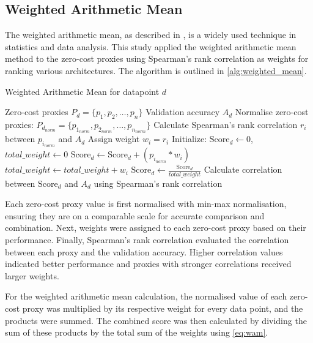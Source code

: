 
\subsection{Weighted Arithmetic Mean}
The weighted arithmetic mean, as described in \autocite{wam}, is a widely used technique in statistics and data analysis. This study applied the weighted arithmetic mean method to the zero-cost proxies using Spearman's rank correlation as weights for ranking various architectures. The algorithm is outlined in \cref{alg:weighted_mean}. 

\clearpage

\begin{algorithm}
\caption{Weighted Arithmetic Mean for datapoint $d$}\label{alg:weighted_mean}
\begin{algorithmic}[1]
\Require Zero-cost proxies $P_d = \{p_1, p_2, \dots, p_n\}$
\Require Validation accuracy $A_d$
\State Normalise zero-cost proxies: $P_{d_{norm}} = \{p_{1_{norm}}, p_{2_{norm}}, \dots, p_{n_{norm}}\}$
    \State Calculate Spearman's rank correlation $r_i$ between $p_{i_{norm}}$ and $A_d$
    \State Assign weight $w_i = r_i$
\EndFor
\State Initialize: $\text{Score}_d \leftarrow 0$, $total\_weight \leftarrow 0$
    \State $\text{Score}_d \leftarrow \text{Score}_d + (p_{i_{norm}} * w_i)$
    \State $total\_weight \leftarrow total\_weight + w_i$
\EndFor
\State $\text{Score}_d \leftarrow \frac{\text{Score}_d}{total\_weight}$
\State Calculate correlation between $\text{Score}_d$ and $A_d$ using Spearman's rank correlation
\end{algorithmic}
\end{algorithm}


Each zero-cost proxy value is first normalised with min-max normalisation, ensuring they are on a comparable scale for accurate comparison and combination. Next, weights were assigned to each zero-cost proxy based on their performance. Finally, Spearman's rank correlation evaluated the correlation between each proxy and the validation accuracy. Higher correlation values indicated better performance and proxies with stronger correlations received larger weights.

For the weighted arithmetic mean calculation, the normalised value of each zero-cost proxy was multiplied by its respective weight for every data point, and the products were summed. The combined score was then calculated by dividing the sum of these products by the total sum of the weights using \cref{eq:wam}. 

